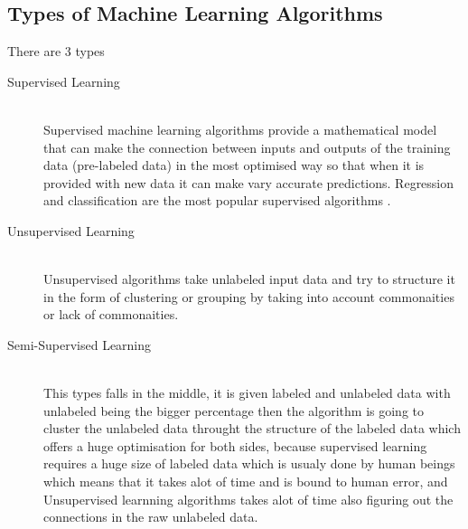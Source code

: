     \subsection{Types of Machine Learning Algorithms}
        There are 3 types ~\cite{ml}
        \begin{description}
        \item[Supervised Learning] \hfill \\
            Supervised machine learning algorithms provide a mathematical model that can make the connection between inputs and outputs of the training data (pre-labeled data) in the most optimised way so that when it is provided with new data it can make vary accurate predictions. Regression and classification are the most popular supervised algorithms .
        \item[Unsupervised Learning] \hfill \\
            Unsupervised algorithms take unlabeled input data and try to structure it in the form of clustering or grouping by taking into account commonaities or lack of commonaities.
        \item[Semi-Supervised Learning] \hfill \\
            This types falls in the middle, it is given labeled and unlabeled data with unlabeled being the bigger percentage then the algorithm is going to cluster the unlabeled data throught the structure of the labeled data which offers a huge optimisation for both sides, because supervised learning requires a huge size of labeled data which is usualy done by human beings which means that it takes alot of time and is bound to human error, and Unsupervised learnning algorithms takes alot of time also figuring out the connections in the raw unlabeled data.
        \end{description}

